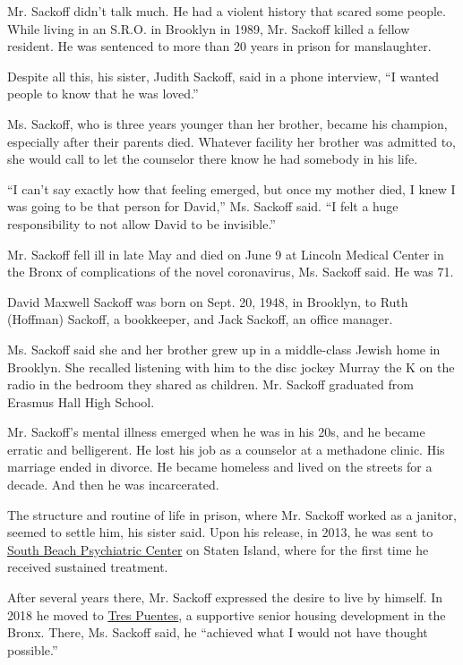 Mr. Sackoff didn't talk much. He had a violent history that scared some
people. While living in an S.R.O. in Brooklyn in 1989, Mr. Sackoff
killed a fellow resident. He was sentenced to more than 20 years in
prison for manslaughter.

Despite all this, his sister, Judith Sackoff, said in a phone interview,
``I wanted people to know that he was loved.''

Ms. Sackoff, who is three years younger than her brother, became his
champion, especially after their parents died. Whatever facility her
brother was admitted to, she would call to let the counselor there know
he had somebody in his life.

``I can't say exactly how that feeling emerged, but once my mother died,
I knew I was going to be that person for David,'' Ms. Sackoff said. ``I
felt a huge responsibility to not allow David to be invisible.''

Mr. Sackoff fell ill in late May and died on June 9 at Lincoln Medical
Center in the Bronx of complications of the novel coronavirus, Ms.
Sackoff said. He was 71.

David Maxwell Sackoff was born on Sept. 20, 1948, in Brooklyn, to Ruth
(Hoffman) Sackoff, a bookkeeper, and Jack Sackoff, an office manager.

Ms. Sackoff said she and her brother grew up in a middle-class Jewish
home in Brooklyn. She recalled listening with him to the disc jockey
Murray the K on the radio in the bedroom they shared as children. Mr.
Sackoff graduated from Erasmus Hall High School.

Mr. Sackoff's mental illness emerged when he was in his 20s, and he
became erratic and belligerent. He lost his job as a counselor at a
methadone clinic. His marriage ended in divorce. He became homeless and
lived on the streets for a decade. And then he was incarcerated.

The structure and routine of life in prison, where Mr. Sackoff worked as
a janitor, seemed to settle him, his sister said. Upon his release, in
2013, he was sent to
\href{https://omh.ny.gov/omhweb/facilities/sbpc/}{South Beach
Psychiatric Center} on Staten Island, where for the first time he
received sustained treatment.

After several years there, Mr. Sackoff expressed the desire to live by
himself. In 2018 he moved to
\href{https://thenyhc.org/projects/tres-puentes/}{Tres Puentes}, a
supportive senior housing development in the Bronx. There, Ms. Sackoff
said, he ``achieved what I would not have thought possible.''

